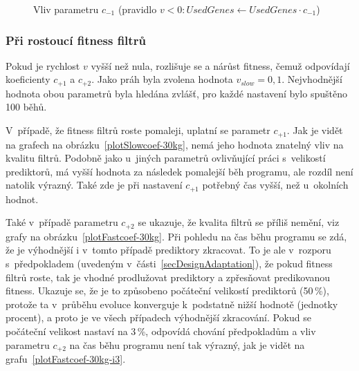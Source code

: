 \begin{figure}[htb]
    \centering
    \caption{Vliv parametru $c_{-1}$ (pravidlo $v < 0: \mathit{UsedGenes} \leftarrow \mathit{UsedGenes} \cdot c_{-1}$)}
    \label{plotDecrcoef-30kg}
\end{figure}

\subsubsection*{Při rostoucí fitness filtrů}

Pokud je rychlost $v$ vyšší než nula, rozlišuje se  a  nárůst fitness, čemuž odpovídají koeficienty $c_{+1}$ a $c_{+2}$. Jako práh byla zvolena hodnota $v_\mathit{slow} = 0,1$. Nejvhodnější hodnota obou parametrů byla hledána zvlášť, pro každé nastavení bylo spuštěno 100 běhů.

V~případě, že fitness filtrů roste pomaleji, uplatní se parametr $c_{+1}$. Jak je vidět na grafech na obrázku~\ref{plotSlowcoef-30kg}, nemá jeho hodnota znatelný vliv na kvalitu filtrů. Podobně jako u~jiných parametrů ovlivňující práci s~velikostí prediktorů, má vyšší hodnota za následek pomalejší běh programu, ale rozdíl není natolik výrazný. Také zde je při nastavení $c_{+1}$ potřebný čas vyšší, než u~okolních hodnot.

Také v~případě parametru $c_{+2}$ se ukazuje, že kvalita filtrů se příliš nemění, viz grafy na obrázku~\ref{plotFastcoef-30kg}. Při pohledu na čas běhu programu se zdá, že je výhodnější i v~tomto případě prediktory zkracovat. To je ale v~rozporu s~předpokladem (uvedeným v~části~\ref{secDesignAdaptation}), že pokud fitness filtrů roste, tak je vhodné prodlužovat prediktory a zpřesňovat predikovanou fitness. Ukazuje se, že je to způsobeno počáteční velikostí prediktorů (50\,\%), protože ta v~průběhu evoluce konverguje k~podstatně nižší hodnotě (jednotky procent), a proto je ve všech případech výhodnější zkracování. Pokud se počáteční velikost nastaví na 3\,\%, odpovídá chování předpokladům a vliv parametru $c_{+2}$ na čas běhu programu není tak výrazný, jak je vidět na grafu~\ref{plotFastcoef-30kg-i3}.

